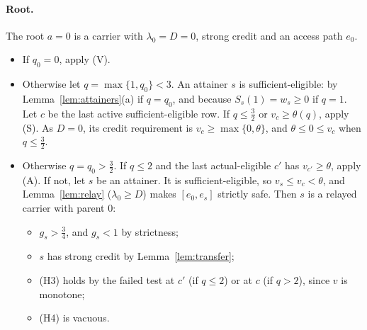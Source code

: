 \documentclass[11pt,a4paper]{article}
\numberwithin{equation}{section}
\theoremstyle{definition}
\begin{document}
\paragraph{Root.} The root $a=0$ is a carrier with $\lambda_0=D=0$, strong
credit and an access path $e_0$.
\begin{itemize}
\item If $q_0=0$, apply (V).
\item Otherwise let $q=\max\{1,q_0\}<3$. An attainer $s$ is
sufficient-eligible: by Lemma~\ref{lem:attainers}(a) if $q=q_0$, and because
$S_s(1)=w_s\ge0$ if $q=1$. Let $c$ be the last active sufficient-eligible row.
If $q\le\frac32$ or $v_c\ge\theta(q)$, apply (S). As $D=0$, its credit
requirement is $v_c\ge\max\{0,\theta\}$, and $\theta\le0\le v_c$ when
$q\le\frac32$.
\item Otherwise $q=q_0>\frac32$. If $q\le2$ and the last actual-eligible $c'$
has $v_{c'}\ge\theta$, apply (A). If not, let $s$ be an attainer. It is
sufficient-eligible, so $v_s\le v_c<\theta$, and Lemma~\ref{lem:relay}
($\lambda_0\ge D$) makes $[e_0,e_s]$ strictly safe. Then $s$ is a relayed
carrier with parent $0$:
\begin{itemize}
\item $g_s>\frac34$, and $g_s<1$ by strictness;
\item $s$ has strong credit by Lemma~\ref{lem:transfer};
\item (H3) holds by the failed test at $c'$ (if $q\le2$) or at $c$ (if $q>2$),
since $v$ is monotone;
\item (H4) is vacuous.
\end{itemize}
\end{itemize}
\end{document}
